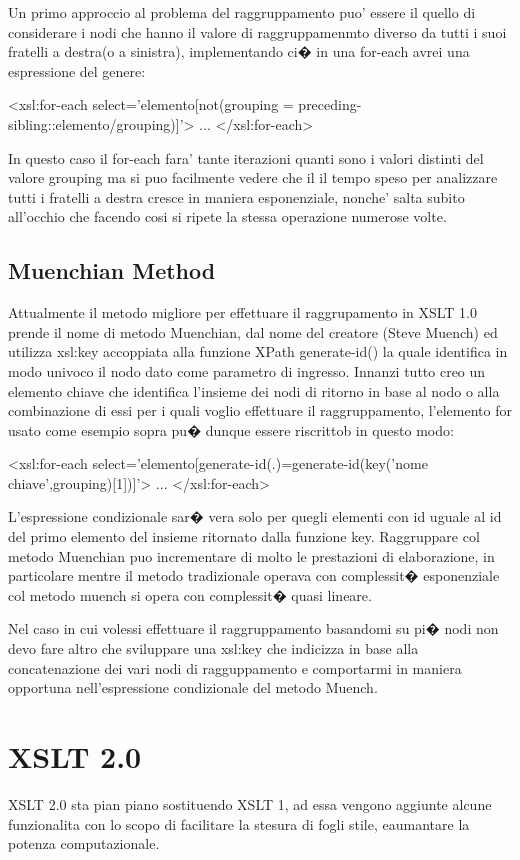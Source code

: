 \documentclass[11pt,titlepage,a4paper,twoside,openany]{book}
\begin{document}
Un primo approccio al problema del raggruppamento puo' essere il quello di considerare i nodi che hanno il valore di raggruppamenmto diverso da tutti i suoi fratelli a destra(o a sinistra), implementando ci� in una for-each avrei una espressione del genere:

<xsl:for-each select='elemento[not(grouping = preceding-sibling::elemento/grouping)]'>
...
</xsl:for-each>

In questo caso il for-each fara' tante iterazioni quanti sono i valori distinti del valore grouping ma si puo facilmente vedere che il il tempo speso per analizzare tutti i fratelli a destra cresce in maniera esponenziale, nonche' salta subito all'occhio che facendo cosi si ripete la stessa operazione numerose volte.

\subsection{Muenchian Method}
Attualmente il metodo migliore per effettuare il raggrupamento in XSLT 1.0 prende il nome di metodo Muenchian, dal nome del creatore (Steve Muench) ed utilizza xsl:key accoppiata alla funzione XPath generate-id() la quale identifica in modo univoco il nodo dato come parametro di ingresso.
Innanzi tutto creo un elemento chiave che identifica l'insieme dei nodi di ritorno in base al nodo o alla combinazione di essi per i quali voglio effettuare il raggruppamento, l'elemento for usato come esempio sopra pu� dunque essere riscrittob in questo modo:

<xsl:for-each select='elemento[generate-id(.)=generate-id(key('nome chiave',grouping)[1])]'>
...
</xsl:for-each>

L'espressione condizionale sar� vera solo per quegli elementi con id uguale al id del primo elemento del insieme ritornato dalla funzione key.
Raggruppare col metodo Muenchian puo incrementare di molto le prestazioni di elaborazione, in particolare mentre il metodo tradizionale operava con complessit� esponenziale col metodo muench si opera con complessit� quasi lineare.

Nel caso in cui volessi effettuare il raggruppamento basandomi su pi� nodi non devo fare altro che sviluppare una xsl:key che indicizza in base alla concatenazione dei vari nodi di ragguppamento e comportarmi in maniera opportuna nell'espressione condizionale del metodo Muench.


\section{XSLT 2.0}
XSLT 2.0 sta pian piano sostituendo XSLT 1, ad essa vengono aggiunte alcune funzionalita con lo scopo di facilitare la stesura di fogli stile, eaumantare la potenza computazionale.
\end{document}
